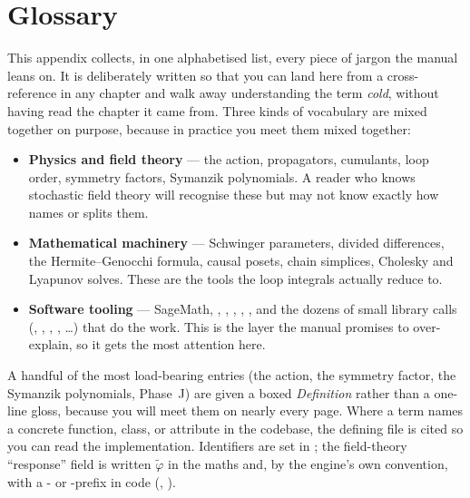 \chapter{Glossary}\label{ch:glossary}

This appendix collects, in one alphabetised list, every piece of jargon the
manual leans on. It is deliberately written so that you can land here from a
cross-reference in any chapter and walk away understanding the term \emph{cold},
without having read the chapter it came from. Three kinds of vocabulary are mixed
together on purpose, because in practice you meet them mixed together:

\begin{itemize}
  \item \textbf{Physics and field theory} --- the \msrjd{} action, propagators,
        cumulants, loop order, symmetry factors, Symanzik polynomials. A reader
        who knows stochastic field theory will recognise these but may not know
        exactly how \Daedalus{} names or splits them.
  \item \textbf{Mathematical machinery} --- Schwinger parameters, divided
        differences, the Hermite--Genocchi formula, causal posets, chain
        simplices, Cholesky and Lyapunov solves. These are the tools the loop
        integrals actually reduce to.
  \item \textbf{Software tooling} --- SageMath, , ,
        , , , and the dozens of small
        library calls (, ,
        , , \ldots) that
        do the work. This is the layer the manual promises to over-explain, so it
        gets the most attention here.
\end{itemize}

\noindent
A handful of the most load-bearing entries (the \msrjd{} action, the symmetry
factor, the Symanzik polynomials, Phase~J) are given a boxed \emph{Definition}
rather than a one-line gloss, because you will meet them on nearly every page.
Where a term names a concrete function, class, or attribute in the codebase, the
defining file is cited so you can read the implementation. Identifiers are set in
; the field-theory ``response'' field is written
$\tilde\varphi$ in the maths and, by the engine's own convention, with a
- or -prefix in code (, ).

